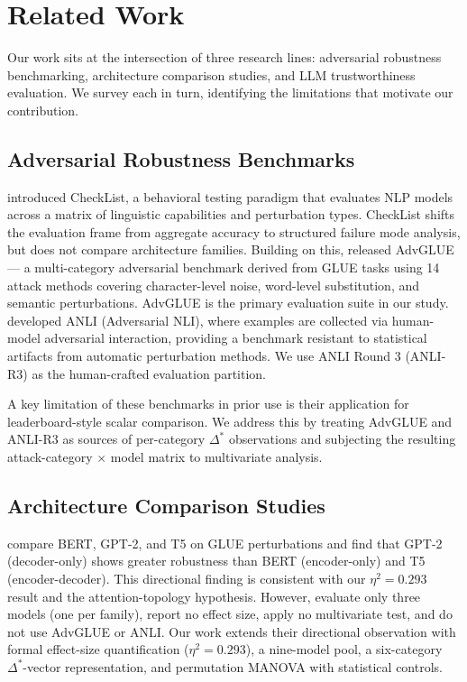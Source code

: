 \section{Related Work}
\label{sec:related}

Our work sits at the intersection of three research lines: adversarial robustness benchmarking,
architecture comparison studies, and LLM trustworthiness evaluation. We survey each in turn,
identifying the limitations that motivate our contribution.

\subsection{Adversarial Robustness Benchmarks}

\citet{Ribeiro2020Beyond} introduced CheckList, a behavioral testing paradigm that evaluates
NLP models across a matrix of linguistic capabilities and perturbation types. CheckList shifts the
evaluation frame from aggregate accuracy to structured failure mode analysis, but does not compare
architecture families. Building on this, \citet{Wang2021Adversarial} released AdvGLUE --- a
multi-category adversarial benchmark derived from GLUE tasks using 14 attack methods covering
character-level noise, word-level substitution, and semantic perturbations. AdvGLUE is the primary
evaluation suite in our study. \citet{Nie2020Adversarial} developed ANLI (Adversarial NLI), where
examples are collected via human-model adversarial interaction, providing a benchmark resistant to
statistical artifacts from automatic perturbation methods. We use ANLI Round 3 (ANLI-R3) as the
human-crafted evaluation partition.

A key limitation of these benchmarks in prior use is their application for leaderboard-style scalar
comparison. We address this by treating AdvGLUE and ANLI-R3 as sources of per-category $\Delta^*$
observations and subjecting the resulting attack-category $\times$ model matrix to multivariate
analysis.

\subsection{Architecture Comparison Studies}

\citet{Neerudu2023Robustness} compare BERT, GPT-2, and T5 on GLUE perturbations and find that
GPT-2 (decoder-only) shows greater robustness than BERT (encoder-only) and T5 (encoder-decoder).
This directional finding is consistent with our $\eta^2=0.293$ result and the attention-topology
hypothesis. However, \citet{Neerudu2023Robustness} evaluate only three models (one per family),
report no effect size, apply no multivariate test, and do not use AdvGLUE or ANLI. Our work extends
their directional observation with formal effect-size quantification ($\eta^2=0.293$), a nine-model
pool, a six-category $\Delta^*$-vector representation, and permutation MANOVA with statistical
controls.

